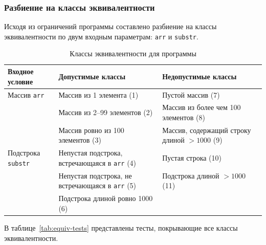 \documentclass{article}[14pt]
\begin{document}
\subsubsection{Разбиение на классы эквивалентности}

Исходя из ограничений программы составлено разбиение на классы эквивалентности по двум входным параметрам: \texttt{arr} и \texttt{substr}.

{\centering\large{
\begin{longtable}{|p{3.5cm}|p{5.5cm}|p{5.5cm}|}
    \caption{Классы эквивалентности для программы}\\
    \hline
    Входное условие & Допустимые классы & Недопустимые классы \\ \hline
    Массив \texttt{arr} &
        Массив из 1 элемента (1) &
        Пустой массив (7) \\ \hline
    &
        Массив из 2--99 элементов (2) &
        Массив из более чем 100 элементов (8) \\ \hline
    &
        Массив ровно из 100 элементов (3) &
        Массив, содержащий строку длиной $> 1000$ (9) \\ \hline
    Подстрока \texttt{substr} &
        Непустая подстрока, встречающаяся в \texttt{arr} (4) &
        Пустая строка (10) \\ \hline
    &
        Непустая подстрока, не встречающаяся в \texttt{arr} (5) &
        Подстрока длиной $> 1000$ (11) \\ \hline
    &
        Подстрока длиной ровно 1000 (6) &
        \\ \hline
\end{longtable}}}

В таблице~\ref{tab:equiv-tests} представлены тесты, покрывающие все классы эквивалентности.
\end{document}
